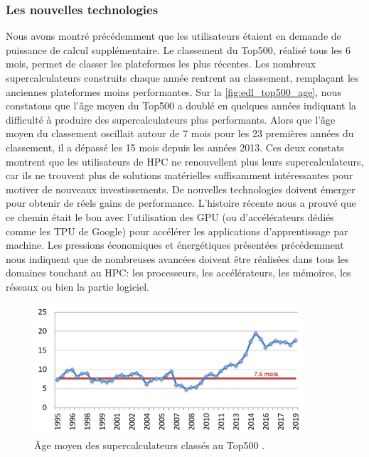     \subsubsection{Les nouvelles technologies}\label{sec:edl_chal_new_techno}

        Nous avons montré précédemment que les utilisateurs étaient en demande de puissance de calcul supplémentaire. 
        Le classement du Top500,  réalisé tous les 6 mois, permet de classer les plateformes les plus récentes. Les nombreux supercalculateurs construits chaque année rentrent au classement, remplaçant les anciennes plateformes moins performantes. Sur la \autoref{fig:edl_top500_age}, nous constatons que l'âge moyen du Top500 a doublé en quelques années indiquant la difficulté à produire des supercalculateurs plus performants. Alors que l'âge moyen du classement oscillait autour de 7 mois pour les 23 premières années du classement, il a dépassé les 15 mois depuis les années 2013. Ces deux constats montrent que les utilisateurs de HPC ne renouvellent plus leurs supercalculateurs, car ils ne trouvent plus de solutions matérielles suffisamment intéressantes pour motiver de nouveaux investissements. De nouvelles technologies doivent émerger pour obtenir de réels gains de performance. L'histoire récente nous a prouvé que ce chemin était le bon avec l'utilisation des GPU (ou d'accélérateurs dédiés comme les TPU de Google) pour accélérer les applications d'apprentissage par machine. Les pressions économiques et énergétiques présentées précédemment nous indiquent que de nombreuses avancées doivent être réalisées dans tous les domaines touchant au HPC: les processeurs, les accélérateurs, les mémoires, les réseaux ou bien la partie logiciel. 
        
        
                  
            \begin{figure}
                \center
                \includegraphics[width=10cm]{images/edl_top500_age.png}
                \caption{\label{fig:edl_top500_age} Âge moyen des supercalculateurs classés au Top500 \cite{Strohmaier2018}.}
            \end{figure}
       
